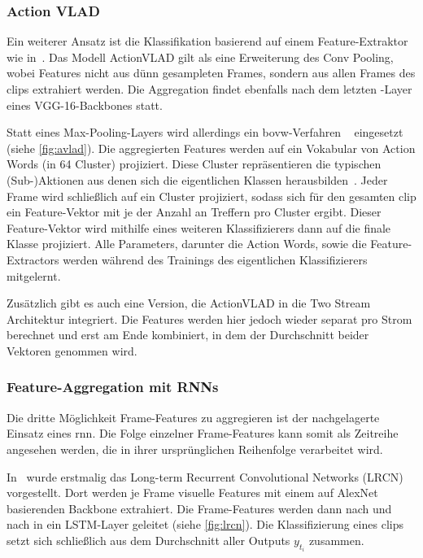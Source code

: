 \subsubsection{Action VLAD}

Ein weiterer Ansatz ist die Klassifikation basierend auf einem Feature-Extraktor wie in~\cite{Girdhar17}.
Das Modell ActionVLAD gilt als eine Erweiterung des Conv Pooling, wobei Features nicht aus dünn gesampleten Frames, sondern aus allen Frames des \glspl{clip} extrahiert werden.
Die Aggregation findet ebenfalls nach dem letzten \conv-Layer eines VGG-16-Backbones statt.

Statt eines Max-Pooling-Layers wird allerdings ein \gls{bovw}-Verfahren ~\cite{Zisserman03} eingesetzt (siehe \autoref{fig:avlad}).
Die aggregierten Features werden auf ein Vokabular von Action Words (in 64 Cluster) projiziert.
Diese Cluster repräsentieren die typischen (Sub-)Aktionen aus denen sich die eigentlichen Klassen herausbilden~\cite{Ghosh18}.
Jeder Frame wird schließlich auf ein Cluster projiziert, sodass sich für den gesamten \gls{clip} ein Feature-Vektor mit je der Anzahl an Treffern pro Cluster ergibt.
Dieser Feature-Vektor wird mithilfe eines weiteren Klassifizierers dann auf die finale Klasse projiziert.
Alle Parameters, darunter die Action Words, sowie die Feature-Extractors werden während des Trainings des eigentlichen Klassifizierers mitgelernt.

Zusätzlich gibt es auch eine Version, die ActionVLAD in die Two Stream Architektur integriert.
Die Features werden hier jedoch wieder separat pro Strom berechnet und erst am Ende kombiniert, in dem der Durchschnitt beider Vektoren genommen wird.

\subsubsection{Feature-Aggregation mit RNNs}

Die dritte Möglichkeit Frame-Features zu aggregieren ist der nachgelagerte Einsatz eines \gls{rnn}.
Die Folge einzelner Frame-Features kann somit als Zeitreihe angesehen werden, die in ihrer ursprünglichen Reihenfolge verarbeitet wird.

In~\cite{Donahue14} wurde erstmalig das Long-term Recurrent Convolutional Networks (LRCN) vorgestellt.
Dort werden je Frame visuelle Features mit einem auf AlexNet basierenden Backbone extrahiert.
Die Frame-Features werden dann nach und nach in ein LSTM-Layer geleitet (siehe \autoref{fig:lrcn}).
Die Klassifizierung eines \glspl{clip} setzt sich schließlich aus dem Durchschnitt aller Outputs $y_{t_i}$ zusammen.

